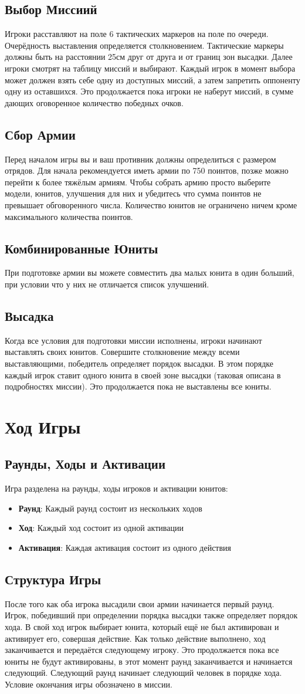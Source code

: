 \documentclass[twocolumn]{article}
\newcommand{\h}[1]{\textbf{#1}}
\newcommand{\ssec}[1]{\section{#1}\label{sec:#1}}
\newcommand{\subsec}[1]{\subsection{#1}\label{subsec:#1}}
\begin{document}
\subsec{Выбор Миссиий}
Игроки расставляют на поле 6 тактических маркеров на поле по очереди. Очерёдность выставления определяется столкновением. Тактические маркеры должны быть на расстоянии 25см друг от друга и от границ зон высадки. Далее игроки смотрят на таблицу миссий и выбирают. Каждый игрок в момент выбора может должен взять себе одну из доступных миссий, а затем запретить оппоненту одну из оставшихся. Это продолжается пока игроки не наберут миссий, в сумме дающих оговоренное количество победных очков.

\subsec{Сбор Армии}
Перед началом игры вы и ваш противник должны определиться с размером отрядов. Для начала рекомендуется иметь армии по 750 поинтов, позже можно перейти к более тяжёлым армиям. Чтобы собрать армию просто выберите модели, юнитов, улучшения для них и убедитесь что сумма поинтов не превышает обговоренного числа. Количество юнитов не ограничено ничем кроме максимального количества поинтов.

\subsec{Комбинированные Юниты}
При подготовке армии вы можете совместить два малых юнита в один больший, при условии что у них не отличается список улучшений.

\subsec{Высадка}
Когда все условия для подготовки миссии исполнены, игроки начинают выставлять своих юнитов. Совершите столкновение между всеми выставляющими, победитель определяет порядок высадки. В этом порядке каждый игрок ставит одного юнита в своей зоне высадки (таковая описана в подробностях миссии). Это продолжается пока не выставлены все юниты.

\newpage

\ssec{Ход Игры}
\subsec{Раунды, Ходы и Активации}
Игра разделена на раунды, ходы игроков и активации юнитов:
\begin{itemize}
    \item \h{Раунд}: Каждый раунд состоит из нескольких ходов
    \item \h{Ход}: Каждый ход состоит из одной активации
    \item \h{Активация}: Каждая активация состоит из одного действия
\end{itemize}

\subsec{Структура Игры}
После того как оба игрока высадили свои армии начинается первый раунд. Игрок, победивший при определении порядка высадки также определяет порядок хода. В свой ход игрок выбирает юнита, который ещё не был активирован и активирует его, совершая действие. Как только действие выполнено, ход заканчивается и передаётся следующему игроку. Это продолжается пока все юниты не будут активированы, в этот момент раунд заканчивается и начинается следующий. Следующий раунд начинает следующий человек в порядке хода. Условие окончания игры обозначено в миссии.
\end{document}
